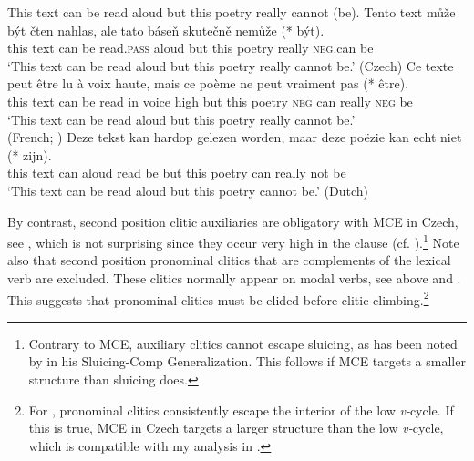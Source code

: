 \documentclass[output=paper,colorlinks,citecolor=brown,
modfonts
]{langscibook}
\begin{document}
\begin{exe}
\ex \label{27}
\begin{xlist}
\ex \label{27a} This text can be read aloud but this poetry really cannot (be).
\ex \label{27b} 
\gll Tento text může být čten nahlas, ale tato báseň  skutečně nemůže (*\hspace{-2pt} být).\\
this text can be read.\textsc{pass} aloud but this poetry really \textsc{neg}.can {} be\\
\glt `This text can be read aloud but this poetry really cannot be.' \hfill (Czech)
\ex \label{27c}
\gll Ce texte peut être lu à voix haute, mais ce poème ne peut vraiment pas (*\hspace{-2pt} être).\\
this text can be read in voice high but this poetry \textsc{neg} can really \textsc{neg} {} be\\
\glt `This text can be read aloud but this poetry really cannot be.' \\ \hfill (French; \citealt{Dagnac2010})
\ex \label{27d} 
\gll Deze tekst kan hardop gelezen worden, maar deze poëzie kan echt niet (*\hspace{-2pt} zijn).\\
this text can aloud read be but this  poetry can  really not {} be\\
\glt `This text can be read aloud but this poetry cannot be.' \hfill (Dutch)
\end{xlist}
\end{exe}	

\noindent By contrast, second position clitic auxiliaries are obligatory with MCE in Czech, see , which is not surprising since they occur very high in the clause (cf. ).\footnote{Contrary to MCE, auxiliary clitics cannot escape sluicing, as has been noted by \cite{Merchant2001} in his Sluicing-Comp Generalization. This follows if MCE targets a smaller structure than sluicing does.} Note also that second position pronominal clitics that are complements of the lexical verb are excluded. These clitics normally appear on modal verbs, see  above and . This suggests that pronominal clitics must be elided before clitic climbing.\footnote{For \cite{Roberts2010}, pronominal clitics consistently escape the interior of the low \textit{v-}cycle. If this is true, MCE in Czech targets a larger structure than the low \textit{v-}cycle, which is compatible with my analysis in  .}
\end{document}

